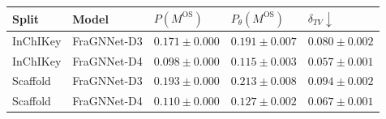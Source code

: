 \begin{tabular}{lllll}
\toprule
Split & Model & $P(M^{\text{OS}})$ & $P_{\theta}(M^{\text{OS}})$ & $\delta_{TV} \downarrow$ \\
\midrule
InChIKey & FraGNNet-D3 & $0.171 \pm 0.000$ & $0.191 \pm 0.007$ & $0.080 \pm 0.002$ \\
InChIKey & FraGNNet-D4 & $0.098 \pm 0.000$ & $0.115 \pm 0.003$ & $0.057 \pm 0.001$ \\
Scaffold & FraGNNet-D3 & $0.193 \pm 0.000$ & $0.213 \pm 0.008$ & $0.094 \pm 0.002$ \\
Scaffold & FraGNNet-D4 & $0.110 \pm 0.000$ & $0.127 \pm 0.002$ & $0.067 \pm 0.001$ \\
\bottomrule
\end{tabular}
